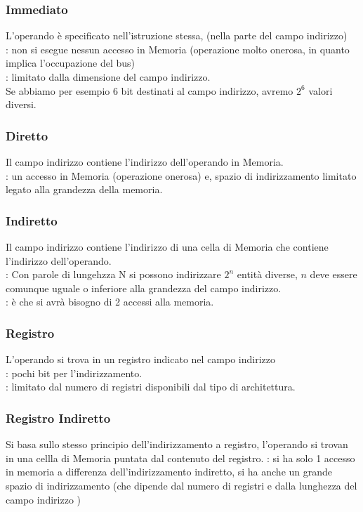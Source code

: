 \documentclass[arch.tex]{subfiles}
\begin{document}
\subsubsection{Immediato}
L'operando è specificato nell'istruzione stessa, (nella parte del campo 
indirizzo)\\
: non si esegue nessun accesso in Memoria
(operazione molto onerosa, in quanto implica l'occupazione del bus)\\
: limitato dalla dimensione del campo indirizzo.\\
Se abbiamo per esempio 6 bit destinati al campo indirizzo, avremo  $ 2^6 $ 
valori diversi.


\subsubsection{Diretto}
Il campo indirizzo contiene l'indirizzo dell'operando in Memoria.\\
: un accesso in Memoria (operazione onerosa) e, spazio di indirizzamento 
limitato legato alla grandezza della memoria.


\subsubsection{Indiretto}
Il campo indirizzo contiene l'indirizzo di una cella di Memoria che contiene 
l'indirizzo dell'operando. \\
: Con parole di lungehzza N si possono indirizzare
$ 2^n $ entità diverse, $ n $ deve essere comunque uguale o inferiore alla
grandezza del campo indirizzo.\\
: è che si avrà bisogno di 2 accessi alla memoria.


\subsubsection{Registro}
L'operando si trova in un registro indicato nel campo indirizzo\\
: pochi bit per l'indirizzamento.\\
: limitato dal numero di registri disponibili dal 
tipo di architettura.


\subsubsection{Registro Indiretto}
Si basa sullo stesso principio dell'indirizzamento a registro, l'operando 
si trovan in una cellla di Memoria puntata dal contenuto del registro.
: si ha solo 1 accesso in memoria a differenza dell'indirizzamento indiretto,
si ha anche un grande spazio di indirizzamento (che dipende dal numero di registri e dalla
lunghezza del campo indirizzo )
\end{document}
